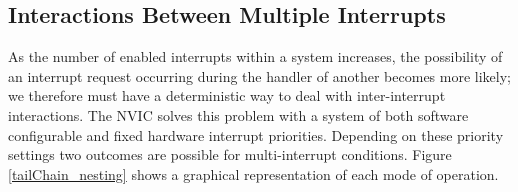 \documentclass[11pt,fleqn]{book} %
\makeatletter
\newcommand{\ilcode}[1]{
    \smallskip
    \colorbox{gray!20!white}{
        \centering
        \parbox{\linewidth-2\fboxsep}{
            \lstinline@#1@
        }
    }
}
\makeatother
\begin{document}


\subsection{\color{orange}Interactions Between Multiple Interrupts}
As the number of enabled interrupts within a system increases, the possibility of an interrupt request occurring during the handler of another becomes more likely; we therefore must have a deterministic way to deal with inter-interrupt interactions. The NVIC solves this problem with a system of both software configurable and fixed hardware interrupt priorities. Depending on these priority settings two outcomes are possible for multi-interrupt conditions. Figure \ref{tailChain_nesting} shows a graphical representation of each mode of operation.
\end{document}
